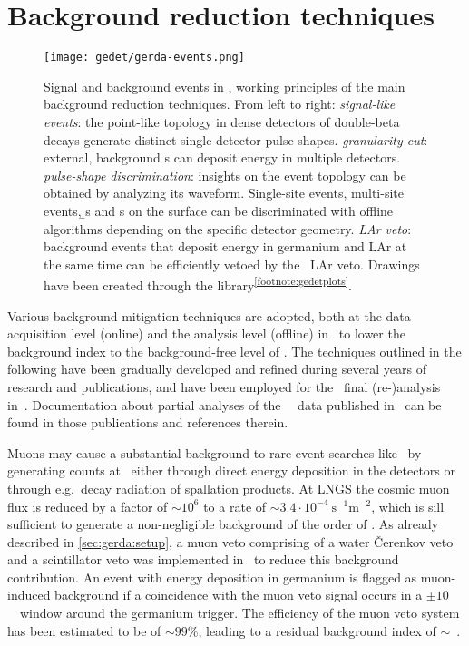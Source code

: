 \section{Background reduction techniques}%
\label{sec:gerda:cuts}

\begin{figure}
  \centering
  \texttt{[image: gedet/gerda-events.png]}
  \caption{%
    Signal and background events in \gerda, working principles of the main background
    reduction techniques. From left to right: \emph{signal-like events}: the point-like
    topology in dense detectors of double-beta decays generate distinct single-detector
    pulse shapes. \emph{granularity cut}: external, background \g{}s can deposit energy
    in multiple detectors. \emph{pulse-shape discrimination}: insights on the event
    topology can be obtained by analyzing its waveform. Single-site events, multi-site
    events, \b{}s and \a{}s on the surface can be discriminated with offline algorithms
    depending on the specific detector geometry. \emph{LAr veto}: background events that
    deposit energy in germanium and LAr at the same time can be efficiently vetoed by
    the \gerda\ LAr veto. Drawings have been
    created through the  library\textsuperscript{\ref{footnote:gedetplots}}.
  }\label{fig:gerda:event-types}
\end{figure}

Various background mitigation techniques are adopted, both at the data acquisition level
(online) and the analysis level (offline) in \gerda\ to lower the background index to the
background-free level of \pIIbi. The techniques outlined in the following have been
gradually developed and refined during several years of research and publications, and
have been employed for the \phasetwo\ final (re-)analysis in~\cite{Agostini2021}.
Documentation about partial analyses of the \gerda\ \phasetwo\ data published
in~\cite{Agostini2015a, Agostini2017, Agostini2018, Agostini2019a} can be found in those
publications and references therein.

Muons may cause a substantial background to rare event searches like \gerda\ by generating
counts at \qbb\ either through direct energy deposition in the detectors or through
e.g.~decay radiation of spallation products. At LNGS the cosmic muon flux is reduced by a
factor of ${\sim}10^6$ to a rate of ${\sim}3.4 \cdot 10^{−4}~\text{s}^{-1}\text{m}^{-2}$,
which is sill sufficient to generate a non-negligible background of the order of
.  As already described in \cref{sec:gerda:setup}, a muon veto comprising of
a water \v{C}erenkov veto and a scintillator veto was implemented in \gerda\ to reduce
this background contribution. An event with energy deposition in germanium is flagged
as muon-induced background if a coincidence with the muon veto signal occurs in a $\pm
10$~\mus\ window around the germanium trigger. The efficiency of the muon veto system
has been estimated to be of ${\sim}99$\%, leading to a residual background index of
${\sim}$~\cite{Freund2016}.

